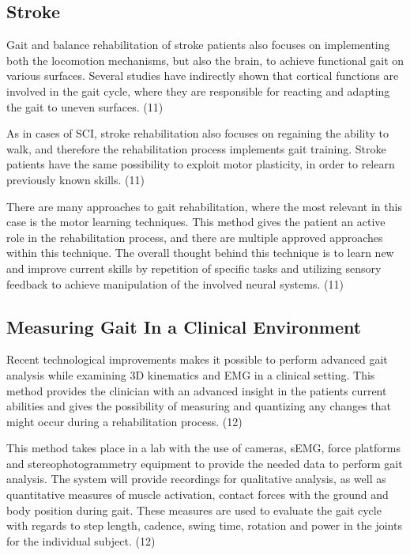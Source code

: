 \subsection{Stroke}

Gait and balance rehabilitation of stroke patients also focuses on implementing both the locomotion mechanisms, but also the brain, to achieve functional gait on various surfaces. Several studies have indirectly shown that cortical functions are involved in the gait cycle, where they are responsible for reacting and adapting the gait to uneven surfaces. (11)

As in cases of SCI, stroke rehabilitation also focuses on regaining the ability to walk, and therefore the rehabilitation process implements gait training. Stroke patients have the same possibility to exploit motor plasticity, in order to relearn previously known skills. (11)

There are many approaches to gait rehabilitation, where the most relevant in this case is the motor learning techniques. This method gives the patient an active role in the rehabilitation process, and there are multiple approved approaches within this technique. The overall thought behind this technique is to learn new and improve current skills by repetition of specific tasks and utilizing sensory feedback to achieve manipulation of the involved neural systems. (11)

\subsection{Measuring Gait In a Clinical Environment}

Recent technological improvements makes it possible to perform advanced gait analysis while examining 3D kinematics and EMG in a clinical setting. This method provides the clinician with an advanced insight in the patients current abilities and gives the possibility of measuring and quantizing any changes that might occur during a rehabilitation process. (12)

This method takes place in a lab with the use of cameras, sEMG, force platforms and stereophotogrammetry equipment to provide the needed data to perform gait analysis. The system will provide recordings for qualitative analysis, as well as quantitative measures of muscle activation, contact forces with the ground and body position during gait. These measures are used to evaluate the gait cycle with regards to step length, cadence, swing time, rotation and power in the joints for the individual subject. (12)

